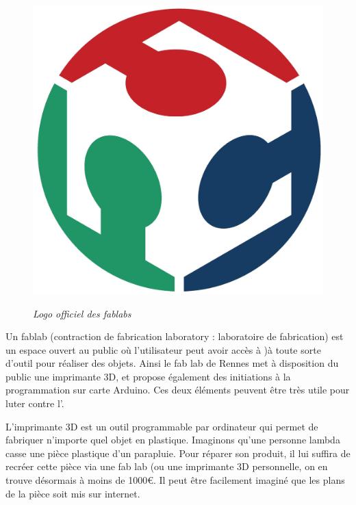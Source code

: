\begin{figure}\begin{center}
\vspace{-0.7cm}\includegraphics[scale=0.33]{Rsc/logofablab.jpg} 

\textit{Logo officiel des fablabs}
\end{center}
\end{figure}

Un fablab (contraction de fabrication laboratory : laboratoire de fabrication) est un espace ouvert au public où l'utilisateur peut avoir accès à )à toute sorte d'outil pour réaliser des objets. Ainsi le fab lab de Rennes met à disposition du public une imprimante 3D, et propose également des initiations à la programmation sur carte Arduino. 
Ces deux éléments peuvent être très utile pour luter contre l'\op. 

L'imprimante 3D est un outil programmable par ordinateur qui permet de fabriquer n'importe quel objet en plastique. Imaginons qu'une personne lambda casse une pièce plastique d'un parapluie. Pour réparer son produit, il lui suffira de recréer cette pièce via une fab lab (ou une imprimante 3D personnelle, on en trouve désormais à moins de 1000\euro. Il peut être facilement imaginé que les plans de la pièce soit mis sur internet. 

